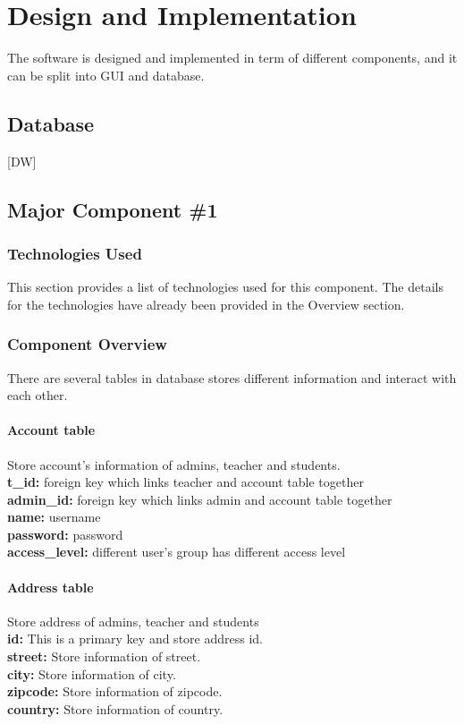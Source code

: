 
\chapter{Design  and Implementation}
The software is designed and implemented in term of different components, and it can be split into GUI and database. \\



\section{Database}
[DW]
 
 

\section{Major Component \#1 }


\subsection{Technologies  Used}
This section provides a list of technologies used for this component.  The details 
for the technologies have already been provided in the Overview section. 

\subsection{Component Overview}
There are several tables in database stores different information and interact with each other.\\


\subsubsection{Account table}
Store account's information of admins, teacher and students.\\
\textbf{t\_id:} foreign key which links teacher and account table together\\
\textbf{admin\_id:} foreign key which links admin and account table together\\
\textbf{name:} username\\
\textbf{password:} password\\
\textbf{access\_level:} different user's group has different access level

\subsubsection{Address table}
Store address of admins, teacher and students\\
\textbf{id:} This is a primary key and store address id.\\
\textbf{street:} Store information of street.\\
\textbf{city:} Store information of city.\\
\textbf{zipcode:} Store information of zipcode.\\
\textbf{country:} Store information of country.\\


